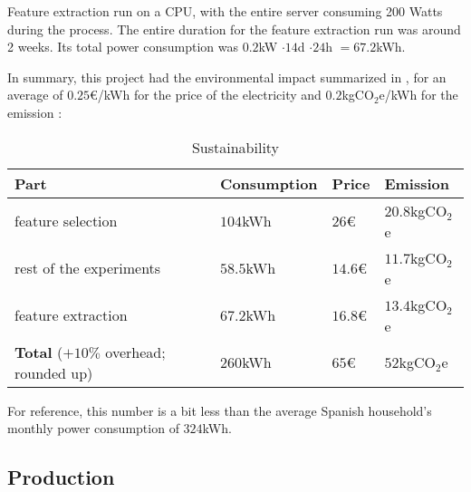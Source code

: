 Feature extraction run on a CPU, with the entire server consuming 200 Watts during the process. The entire duration for the feature extraction run was around 2 weeks. Its total power consumption was $0.2$kW $ \cdot 14$d $ \cdot 24$h $ = 67.2$kWh.\par
In summary, this project had the environmental impact summarized in , for an average of $0.25$€/kWh for the price of the electricity \cite{kwhprice} and $0.2$kgCO$_{2}$e/kWh for the emission \cite{carbon}:
\begin{table}[H]
\centering
\begin{tabular}{|l|l|l|l|}
\hline
\textbf{Part} & \textbf{Consumption} & \textbf{Price} & \textbf{Emission} \\ \hline
feature selection & $104$kWh & $26$€ & $20.8$kgCO$_{2}$e \\ \hline
rest of the experiments & $58.5$kWh & $14.6$€ & $11.7$kgCO$_{2}$e \\ \hline
feature extraction & $67.2$kWh & $16.8$€ & $13.4$kgCO$_{2}$e \\ \hline
\textbf{Total} ($+10\%$ overhead; rounded up) & $260$kWh & $65$€ & $52$kgCO$_{2}$e \\ \hline
\end{tabular}
\caption{Sustainability}
\label{tab:sus1}
\end{table}
For reference, this number is a bit less than the average Spanish household's monthly power consumption of $324$kWh. \cite{kwhavg}

\subsection{Production}
\label{sec:susprod}

